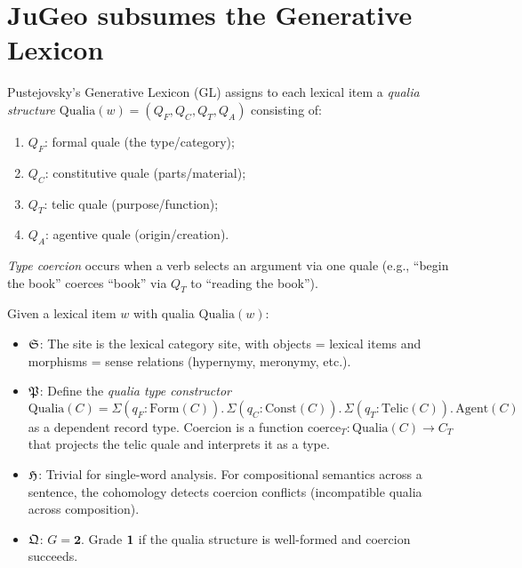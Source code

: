 \section{JuGeo subsumes the Generative Lexicon}
\label{sec:sub-gl}

\begin{definition}
\label{def:gl}
Pustejovsky's Generative Lexicon (GL) assigns to each lexical item
a \emph{qualia structure} $\mathrm{Qualia}(w) = (Q_F, Q_C, Q_T,
Q_A)$ consisting of:
\begin{enumerate}[label=(\roman*),nosep]
\item $Q_F$: formal quale (the type/category);
\item $Q_C$: constitutive quale (parts/material);
\item $Q_T$: telic quale (purpose/function);
\item $Q_A$: agentive quale (origin/creation).
\end{enumerate}
\emph{Type coercion} occurs when a verb selects an argument via
one quale (e.g., ``begin the book'' coerces ``book'' via $Q_T$
to ``reading the book'').
\end{definition}

\begin{construction}
\label{con:gl-embed}
Given a lexical item $w$ with qualia $\mathrm{Qualia}(w)$:
\begin{itemize}[nosep]
\item $\mathfrak{S}$: The site is the lexical category site, with objects
  = lexical items and morphisms = sense relations (hypernymy,
  meronymy, etc.).

\item $\mathfrak{P}$: Define the \emph{qualia type constructor}
  \[
    \mathrm{Qualia}(C) = \Sigma(q_F : \mathrm{Form}(C)).\,
    \Sigma(q_C : \mathrm{Const}(C)).\,
    \Sigma(q_T : \mathrm{Telic}(C)).\,
    \mathrm{Agent}(C)
  \]
  as a dependent record type.  Coercion is a function
  $\mathrm{coerce}_T : \mathrm{Qualia}(C) \to C_T$ that
  projects the telic quale and interprets it as a type.

\item $\mathfrak{H}$: Trivial for single-word analysis.  For
  compositional semantics across a sentence, the cohomology
  detects coercion conflicts (incompatible qualia across
  composition).

\item $\mathfrak{Q}$: $G = \mathbf{2}$.  Grade $\mathbf{1}$ if the qualia
  structure is well-formed and coercion succeeds.
\end{itemize}
\end{construction}

